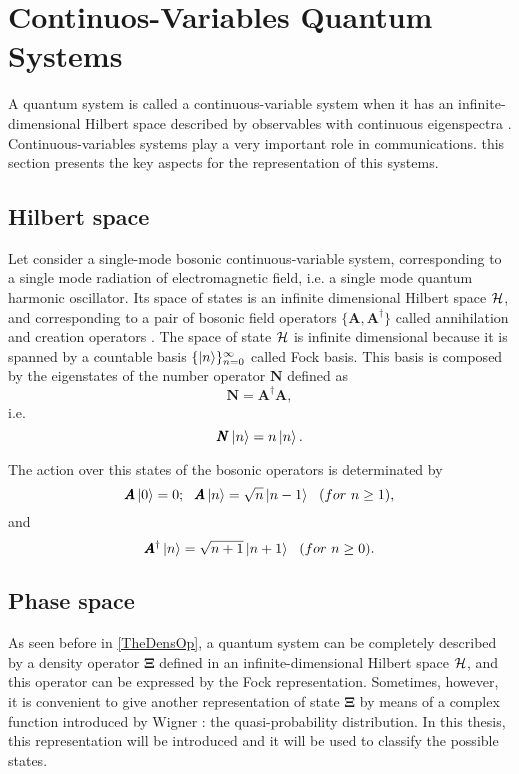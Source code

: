 \section{Continuos-Variables Quantum Systems}
    A quantum system is called a continuous-variable system
    when it has an infinite-dimensional Hilbert space described
    by observables with continuous eigenspectra \cite{ContinuousVar}.
    Continuous-variables systems play a very important role in communications. this
    section presents the key aspects for the representation of this systems.
            
    \subsection{Hilbert space}
        Let consider a single-mode bosonic continuous-variable system, corresponding to a single
        mode radiation of electromagnetic field, i.e. a single mode quantum harmonic oscillator.
        Its space of states is an infinite dimensional Hilbert space $\mathcal{H}$, and corresponding
        to a pair of bosonic field operators $\{ \pmb{A},\pmb{A}^{\dagger}\}$ called annihilation
        and creation operators \cite{ContinuousVar}.
        The space of state $\mathcal{H}$ is infinite dimensional because it is spanned by a countable
        basis $\{\ket{n}\}_{n=0}^\infty$ called Fock basis. This basis is composed by the
        eigenstates of the number operator $\pmb{N}$ defined as
        \begin{equation}
            \pmb{N}=\pmb{A}^\dagger \pmb{A},
        \end{equation}
        i.e. 
        \begin{equation*}
            \pmb{N}\ket{n}=n\ket{n}.
        \end{equation*}

        The action over this states of the bosonic operators is determinated by \cite{ContinuousVar}
        \begin{equation}
            \pmb{A}\ket{0}=0;\ \ \pmb{A}\ket{n}=\sqrt{n}\ket{n-1}\ \ (for\ n \geq 1),
        \end{equation}
        and
        \begin{equation*}
            \pmb{A}^\dagger\ket{n}=\sqrt{n+1}\ket{n+1}\ \ (for\ n \geq 0).
        \end{equation*}
        
        
    \subsection{Phase space}
        As seen before in \ref{TheDensOp}, a quantum system can be completely
        described by a density operator $\pmb{\Xi}$ defined in an infinite-dimensional Hilbert space
        $\mathcal{H}$, and this operator can be expressed by the Fock representation. %
        Sometimes, however, it is convenient to give another representation of state $\pmb{\Xi}$ by
        means of a complex function introduced by Wigner \cite{Wigner}: the quasi-probability 
        distribution. In this thesis, this representation will be introduced and it will be used to
        classify the possible states.

